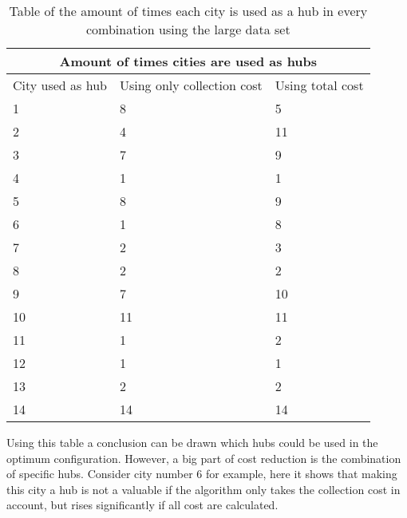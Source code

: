 \documentclass{article}
\begin{document}
            \begin{table}[h!]
                \begin{center}
                \begin{tabular}{|p{3cm}|p{3cm}|p{3cm}|}
                    \hline
                    \multicolumn{3}{|c|}{Amount of times cities are used as hubs} \\
                    \hline
                    City used as hub & Using only collection cost & Using total cost\\
                    \hline
                    1 &  8 & 5 \\
                    \hline
                    2 & 4   & 11 \\
                    \hline
                    3& 7 & 9\\
                    \hline
                    4  & 1 & 1 \\
                    \hline
                    5 & 8 & 9\\
                    \hline
                    6 & 1 & 8   \\
                    \hline
                    7 & 2& 3 \\
                    \hline
                    8 & 2 & 2 \\
                    \hline
                    9 &  7& 10 \\
                    \hline
                    10 & 11 & 11 \\
                    \hline
                    11 & 1& 2 \\
                    \hline
                    12 & 1 & 1 \\
                    \hline
                    13 & 2& 2 \\
                    \hline
                    14 & 14& 14 \\
                    \hline
                \end{tabular}
                \end{center}
                \caption{Table of the amount of times each city is used as a hub in every combination using the large data set}
                \label{amount of times hubs are used in collection} 
            \end{table}
    
            Using this table a conclusion can be drawn which hubs could be used in the optimum configuration. However, a big part of cost reduction is the combination of specific hubs. Consider city number 6 for example, here it shows that making this city a hub is not a valuable if the algorithm only takes the collection cost in account, but rises significantly if all cost are calculated. 
            
\end{document}
